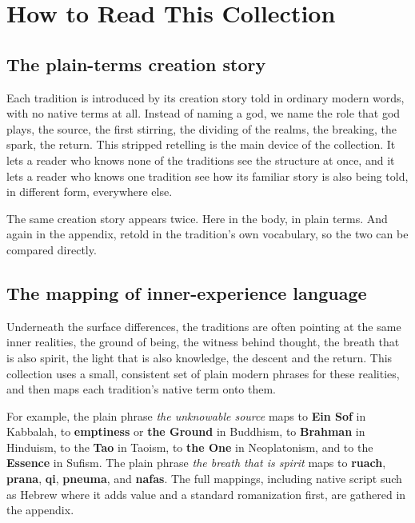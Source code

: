 \chapter*{How to Read This Collection}

\section*{The plain-terms creation story}

Each tradition is introduced by its creation story told in ordinary modern words, with no native terms at all.
Instead of naming a god, we name the role that god plays, the source, the first stirring, the dividing of the
realms, the breaking, the spark, the return. This stripped retelling is the main device of the collection. It
lets a reader who knows none of the traditions see the structure at once, and it lets a reader who knows one
tradition see how its familiar story is also being told, in different form, everywhere else.

The same creation story appears twice. Here in the body, in plain terms. And again in the appendix, retold in
the tradition's own vocabulary, so the two can be compared directly.

\section*{The mapping of inner-experience language}

Underneath the surface differences, the traditions are often pointing at the same inner realities, the ground
of being, the witness behind thought, the breath that is also spirit, the light that is also knowledge, the
descent and the return. This collection uses a small, consistent set of plain modern phrases for these
realities, and then maps each tradition's native term onto them.

For example, the plain phrase \textit{the unknowable source} maps to \textbf{Ein Sof} in Kabbalah, to
\textbf{emptiness} or \textbf{the Ground} in Buddhism, to \textbf{Brahman} in Hinduism, to the \textbf{Tao}
in Taoism, to \textbf{the One} in Neoplatonism, and to the \textbf{Essence} in Sufism. The plain phrase
\textit{the breath that is spirit} maps to \textbf{ruach}, \textbf{prana}, \textbf{qi}, \textbf{pneuma}, and
\textbf{nafas}. The full mappings, including native script such as Hebrew where it adds value and a standard
romanization first, are gathered in the appendix.

